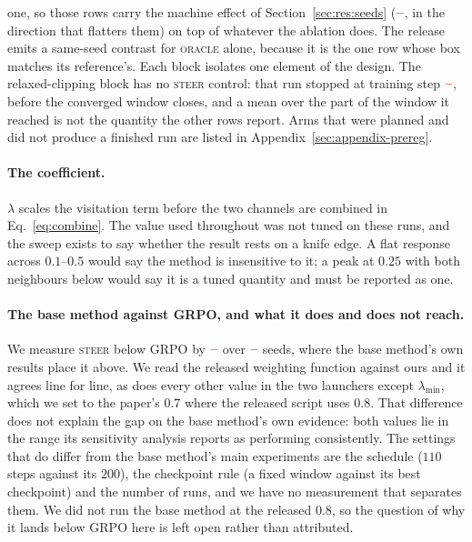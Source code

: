 \documentclass[11pt]{article}
\providecommand{\PENDING}{\textcolor{red}{\textbf{--}}}
\newcommand{\num}[1]{\ifcsname #1\endcsname\csname #1\endcsname\else\PENDING\fi}
\begin{document}
\begin{table}[t]
{one, so those rows carry the machine effect of Section~\ref{sec:res:seeds}
($\num{Boxdelta}$, in the direction that flatters them) on top of whatever the
ablation does. The release emits a same-seed contrast for \textsc{oracle} alone,
because it is the one row whose box matches its reference's. Each block isolates one
element of the design. The relaxed-clipping block has no \textsc{steer} control: that
run stopped at training step $\num{Rxclipsteerlaststep}$, before the converged window
closes, and a mean over the part of the window it reached is not the quantity the
other rows report. Arms that were planned and did not produce a finished run are
listed in Appendix~\ref{sec:appendix-prereg}.}
\label{tab:followups}
\end{table}

\paragraph{The coefficient.} $\lambda$ scales the visitation term before the two
channels are combined in Eq.~\eqref{eq:combine}. The value used throughout was not
tuned on these runs, and the sweep exists to say whether the result rests on a knife
edge. A flat response across $0.1$--$0.5$ would say the method is insensitive to it;
a peak at $0.25$ with both neighbours below would say it is a tuned quantity and must
be reported as one.

\paragraph{The base method against GRPO, and what it does and does not reach.} We
measure \textsc{steer} below GRPO by $\num{Csteergrpoacc}$ over
$\num{Nseedsused}$ seeds, where the base method's own results place it above. We
read the released weighting function against ours and it agrees line for line, as
does every other value in the two launchers except $\lambda_{\min}$, which we set to
the paper's $0.7$ where the released script uses $0.8$. That difference does not
explain the gap on the base method's own evidence: both values lie in the range its
sensitivity analysis reports as performing consistently. The settings that do differ
from the base method's main experiments are the schedule ($110$ steps against its
$200$), the checkpoint rule (a fixed window against its best checkpoint) and the
number of runs, and we have no measurement that separates them. We did not run the
base method at the released $0.8$, so the question of why it lands below GRPO here
is left open rather than attributed.
\end{document}
